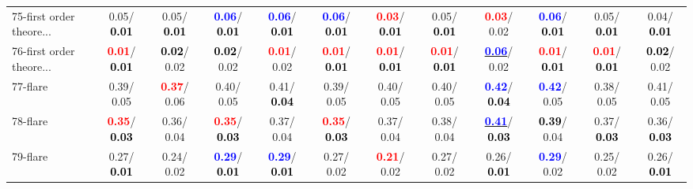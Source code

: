 \begin{table}[h]
\begin{center}
{\begin{tabular}{lc|c|c|c|c|c|c|c|c|c|c}
75-first order theore... &   0.05/\textcolor{black}{\textbf{  0.01}} &   0.05/\textcolor{black}{\textbf{  0.01}} & \textcolor{blue}{\textbf{  0.06}}/\textcolor{black}{\textbf{  0.01}} & \textcolor{blue}{\textbf{  0.06}}/\textcolor{black}{\textbf{  0.01}} & \textcolor{blue}{\textbf{  0.06}}/\textcolor{black}{\textbf{  0.01}} & \textcolor{red}{\textbf{  0.03}}/\textcolor{black}{\textbf{  0.01}} &   0.05/\textcolor{black}{\textbf{  0.01}} & \textcolor{red}{\textbf{  0.03}}/  0.02 & \textcolor{blue}{\textbf{  0.06}}/\textcolor{black}{\textbf{  0.01}} &   0.05/\textcolor{black}{\textbf{  0.01}} &   0.04/\textcolor{black}{\textbf{  0.01}} \\
76-first order theore... & \textcolor{red}{\textbf{  0.01}}/\textcolor{black}{\textbf{  0.01}} & \textcolor{black}{\textbf{  0.02}}/  0.02 & \textcolor{black}{\textbf{  0.02}}/  0.02 & \textcolor{red}{\textbf{  0.01}}/  0.02 & \textcolor{red}{\textbf{  0.01}}/\textcolor{black}{\textbf{  0.01}} & \textcolor{red}{\textbf{  0.01}}/\textcolor{black}{\textbf{  0.01}} & \textcolor{red}{\textbf{  0.01}}/\textcolor{black}{\textbf{  0.01}} & \underline{\textcolor{blue}{\textbf{  0.06}}}/  0.02 & \textcolor{red}{\textbf{  0.01}}/\textcolor{black}{\textbf{  0.01}} & \textcolor{red}{\textbf{  0.01}}/\textcolor{black}{\textbf{  0.01}} & \textcolor{black}{\textbf{  0.02}}/  0.02 \\
77-flare &   0.39/  0.05 & \textcolor{red}{\textbf{  0.37}}/  0.06 &   0.40/  0.05 &   0.41/\textcolor{black}{\textbf{  0.04}} &   0.39/  0.05 &   0.40/  0.05 &   0.40/  0.05 & \textcolor{blue}{\textbf{  0.42}}/\textcolor{black}{\textbf{  0.04}} & \textcolor{blue}{\textbf{  0.42}}/  0.05 &   0.38/  0.05 &   0.41/  0.05 \\
78-flare & \textcolor{red}{\textbf{  0.35}}/\textcolor{black}{\textbf{  0.03}} &   0.36/  0.04 & \textcolor{red}{\textbf{  0.35}}/\textcolor{black}{\textbf{  0.03}} &   0.37/  0.04 & \textcolor{red}{\textbf{  0.35}}/\textcolor{black}{\textbf{  0.03}} &   0.37/  0.04 &   0.38/  0.04 & \underline{\textcolor{blue}{\textbf{  0.41}}}/\textcolor{black}{\textbf{  0.03}} & \textcolor{black}{\textbf{  0.39}}/  0.04 &   0.37/\textcolor{black}{\textbf{  0.03}} &   0.36/\textcolor{black}{\textbf{  0.03}} \\ \hline
79-flare &   0.27/\textcolor{black}{\textbf{  0.01}} &   0.24/  0.02 & \textcolor{blue}{\textbf{  0.29}}/\textcolor{black}{\textbf{  0.01}} & \textcolor{blue}{\textbf{  0.29}}/\textcolor{black}{\textbf{  0.01}} &   0.27/  0.02 & \textcolor{red}{\textbf{  0.21}}/  0.02 &   0.27/  0.02 &   0.26/\textcolor{black}{\textbf{  0.01}} & \textcolor{blue}{\textbf{  0.29}}/  0.02 &   0.25/  0.02 &   0.26/\textcolor{black}{\textbf{  0.01}} \\

\end{tabular}}
\end{center}
\end{table}
